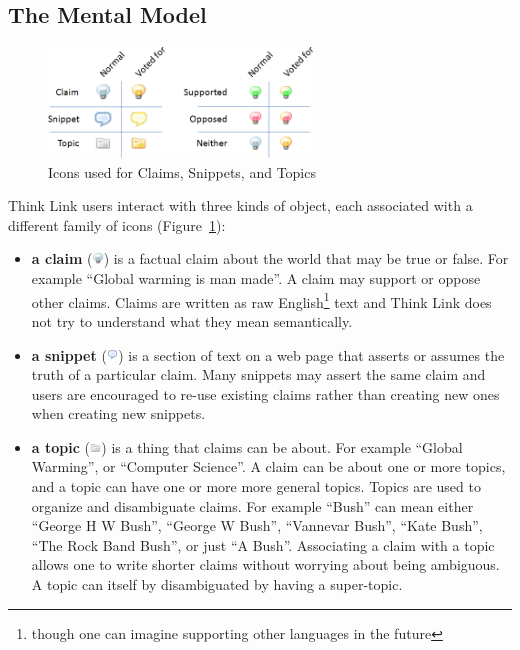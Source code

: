 \documentclass{chi2009}
\begin{document}
\subsection{The Mental Model}

\begin{figure}[tb]
	\begin{center}
	\includegraphics[width=7cm]{../screenshots/bookmark_icons2.png}
	\caption{Icons used for Claims, Snippets, and Topics}
	\label{bookmark_icons}
	\end{center}
\end{figure}

Think Link users interact with three kinds of object, each associated with a different family of icons (Figure~\ref{bookmark_icons}): 	

\begin{itemize}
\item {\bf a claim} (\includegraphics[width=0.3cm]{../images/lightbulb_off.png}) is a factual claim about the world that may be true or false. For example ``Global warming is man made''. A claim may support or oppose other claims. Claims are written as raw English\footnote{though one can imagine supporting other languages in the future} text and Think Link does not try to understand what they mean semantically.
\item {\bf a snippet} (\includegraphics[width=0.3cm]{../images/comment.png}) is a section of text on a web page that asserts or assumes the truth of a particular claim. Many snippets may assert the same claim and users are encouraged to re-use existing claims rather than creating new ones when creating new snippets.
\item {\bf a topic} (\includegraphics[width=0.3cm]{../images/folder_grey.png}) is a thing that claims can be about. For example ``Global Warming'', or ``Computer Science''. A claim can be about one or more topics, and a topic can have one or more more general topics. Topics are used to organize and disambiguate claims. For example ``Bush'' can mean either ``George H W Bush'', ``George W Bush'', ``Vannevar Bush'', ``Kate Bush'', ``The Rock Band Bush'', or just ``A Bush''. Associating a claim with a topic allows one to write shorter claims without worrying about being ambiguous. A topic can itself by disambiguated by having a super-topic.
\end{itemize}
\end{document}
